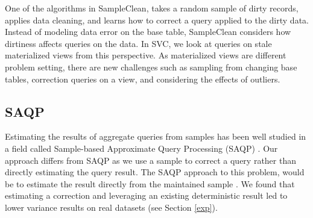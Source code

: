 One of the algorithms in SampleClean, takes a random sample of dirty records, applies data cleaning, and learns how to correct a query applied to the dirty data.
Instead of modeling data error on the base table, SampleClean considers how dirtiness affects queries on the data.
In SVC, we look at queries on stale materialized views from this perspective.
As materialized views are different problem setting, there are new challenges such as sampling from changing base tables, correction queries on a view, and considering the effects of outliers.

\subsection{SAQP}
Estimating the results of aggregate queries from samples has been
well studied in a field called Sample-based Approximate Query Processing
(SAQP) \cite{OlkenR86,AgarwalMPMMS13}.
Our approach differs from SAQP as we use a sample to correct a query rather than directly estimating the query result.
The SAQP approach to this problem, would be to
estimate the result directly from the maintained sample \cite{joshi2008materialized}.
We found that estimating
a correction and leveraging an existing deterministic result led
to lower variance results on real datasets (see Section \ref{exp}). 


